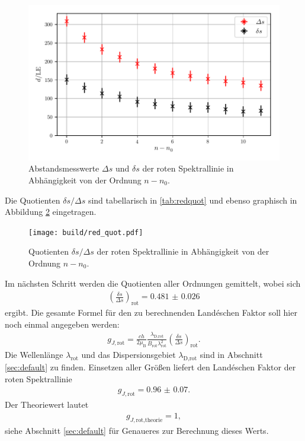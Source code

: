 \begin{figure}[H]
  \centering
  \includegraphics{Zusatzplots/red_ds.pdf}
  \caption{Abstandsmesswerte $\Delta s$ und $\delta s$ der roten Spektrallinie in Abhängigkeit von der Ordnung $n-n_0$.}
  \label{fig:redds}
\end{figure}

Die Quotienten $\delta s/\Delta s$ sind tabellarisch in \ref{tab:redquot} und ebenso
graphisch in Abbildung \ref{fig:redquot} eingetragen.

\begin{figure}[H]
  \centering
  \texttt{[image: build/red\_quot.pdf]}
  \caption{Quotienten $\delta s/\Delta s$ der roten Spektrallinie in Abhängigkeit von der Ordnung $n-n_0$.}
  \label{fig:redquot}
\end{figure}

Im nächsten Schritt werden die Quotienten aller Ordnungen gemittelt, wobei sich
\begin{align}
  \left(\frac{\delta s}{\Delta s}\right)_\text{rot} = \num{0.481(26)}
\end{align}
ergibt. Die gesamte Formel für den zu berechnenden Landéschen Faktor soll hier noch
einmal angegeben werden:
\begin{align}
  g_{J,\text{rot}} = \frac{c h}{2 \mu_\text{B}} \frac{\lambda_\text{D,rot}}{B_\text{rot} \lambda_\text{rot}^2} \left(\frac{\delta s}{\Delta s}\right)_\text{rot}.
\end{align}
Die Wellenlänge $\lambda_\text{rot}$ und das Dispersionsgebiet $\lambda_\text{D,rot}$ sind in Abschnitt \ref{sec:default}
zu finden. Einsetzen aller Größen liefert den Landéschen Faktor der roten Spektrallinie
\begin{align}
  g_{J,\text{rot}} = \num{0.96(7)}.
\end{align}
Der Theoriewert lautet
\begin{align}
  g_{J,\text{rot,theorie}} = 1,
\end{align}
siehe Abschnitt \ref{sec:default} für Genaueres zur Berechnung dieses Werts.

